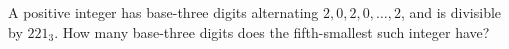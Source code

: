 A positive integer has base-three digits alternating $2,0,2,0,\ldots,2$, and is divisible by $221_3$. How many base-three digits does the fifth-smallest such integer have?
